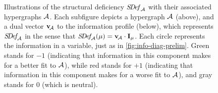 \begin{figure}
	\addtocounter{figure}{-1} %
	\caption[Illustrations of the information deficiency ($\SDef_{\!\Ar})$ 
		for various hypergraphs $\Ar$]
	{
    Illustrations of the structural deficiency $\mathit{S\mskip-3.5muD\mskip-2.5mue\mskip-1.5muf}_{\mathcal A}$ 
    with their associated hypergraphs $\Ar$.
	Each subfigure depicts a hypergraph $\Ar$ (above), and a dual vector $\mathbf v_{\!\mathcal A}$ to the information profile (below), which represents $\mathit{S\mskip-3.5muD\mskip-2.5mue\mskip-1.5muf}_{\!\mathcal A}$ in the sense 
	that $\mathit{S\mskip-3.5muD\mskip-2.5mue\mskip-1.5muf}_{\!\mathcal A}(\mu) = \mathbf v_{\!\mathcal A} \cdot \mathbf I_\mu$.
	Each circle represents the information in a variable,
	 	just as in \cref{fig:info-diag-prelim}.
	Green stands for $-1$ (indicating that information in this component makes for a better fit to $\Ar$),
		while red stands for $+1$ (indicating that information in this component makes for a worse fit to $\Ar$),
		and gray stands for $0$ (which is neutral). 	
	  }
	\label{fig:sdef-example-panel}
\end{figure}

